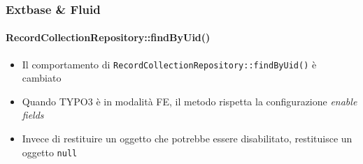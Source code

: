 
\begin{frame}[fragile]
	\frametitle{Extbase \& Fluid}
	\framesubtitle{RecordCollectionRepository::findByUid()}

	\begin{itemize}
		\item Il comportamento di \texttt{RecordCollectionRepository::findByUid()} è cambiato
		\item Quando TYPO3 è in modalità FE, il metodo rispetta la configurazione \textit{enable fields}
		\item Invece di restituire un oggetto che potrebbe essere disabilitato, restituisce un oggetto \texttt{null}

	\end{itemize}

\end{frame}

